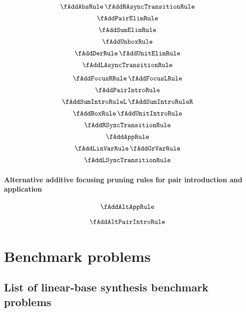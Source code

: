 \begin{align*}
\begin{array}{c}
  \fAddAbsRule
  \,
  \fAddRAsyncTransitionRule
  \\[0.5em]
  \fAddPairElimRule
  \\[0.5em]
  \fAddSumElimRule
  \\[0.5em]
  \fAddUnboxRule
  \\[0.5em]
  \fAddDerRule
  \,
  \fAddUnitElimRule
  \\[0.5em]
  \fAddLAsyncTransitionRule
  \\[0.75em]
  \fAddFocusRRule
  \,
  \fAddFocusLRule
  \\[0.5em]
  \fAddPairIntroRule
  \\[0.5em]
  \fAddSumIntroRuleL
  \,
  \fAddSumIntroRuleR
  \\[0.5em]
  \fAddBoxRule
  \,
  \fAddUnitIntroRule
  \\[0.5em]
  \fAddRSyncTransitionRule
  \\[0.5em]
  \fAddAppRule
  \\[0.5em]
  \fAddLinVarRule
  \,
  \fAddGrVarRule
  \\[0.5em]
  \fAddLSyncTransitionRule
  \end{array}
  \end{align*}

\subsubsection{Alternative additive focusing pruning rules for pair introduction and application}
\label{app:focusing-add-prune}

  \begin{align*}
    \begin{array}{c}
      \fAddAltAppRule
    \\[1em]
      \fAddAltPairIntroRule
      \end{array}
  \end{align*}


\chapter{Benchmark problems}
\section{List of linear-base synthesis benchmark problems}
\label{app:list-of-types}


